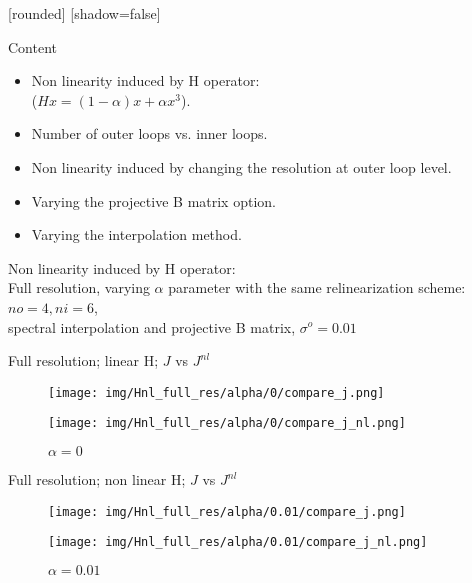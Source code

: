 \documentclass[francais]{beamer}
\title[Nicolas Baillot d'Etivaux]{}
\begin{document}
[rounded]%
[shadow=false]


\begin{frame}{Content}
\begin{itemize}
\item Non linearity induced by H operator:\\
($Hx = (1-\alpha) x+ \alpha x^3$).
\item Number of outer loops vs. inner loops.\\
\item Non linearity induced by changing the resolution at outer loop level.
\item Varying the projective B matrix option.\\
\item Varying the interpolation method.
\end{itemize}
\end{frame}



\begin{frame}
\begin{center}
\huge{Non linearity induced by H operator:}\\
\vspace{+0.5cm}
\Large{Full resolution, varying $\alpha$ parameter with the same relinearization scheme: $no=4, ni=6$,\\
spectral interpolation and projective B matrix,
$\sigma^o=0.01$}
\end{center}
\end{frame}

\begin{frame}{Full resolution; linear H; $J$ vs $J^{nl}$}
\begin{center}
\begin{figure}
  \texttt{[image: img/Hnl\_full\_res/alpha/0/compare\_j.png]}
  \caption{$\alpha = 0$}
\endminipage\hfill
{}
  \texttt{[image: img/Hnl\_full\_res/alpha/0/compare\_j\_nl.png]}
  \caption{$\alpha = 0$}
\endminipage
\end{figure}
\end{center}
\end{frame}

\begin{frame}{Full resolution; non linear H; $J$ vs $J^{nl}$}
\begin{center}
\begin{figure}
  \texttt{[image: img/Hnl\_full\_res/alpha/0.01/compare\_j.png]}
  \caption{$\alpha = 0.01$}
\endminipage\hfill
{}
  \texttt{[image: img/Hnl\_full\_res/alpha/0.01/compare\_j\_nl.png]}
  \caption{$\alpha = 0.01$}
\endminipage
\end{figure}
\end{center}
\end{frame}
\end{document}
